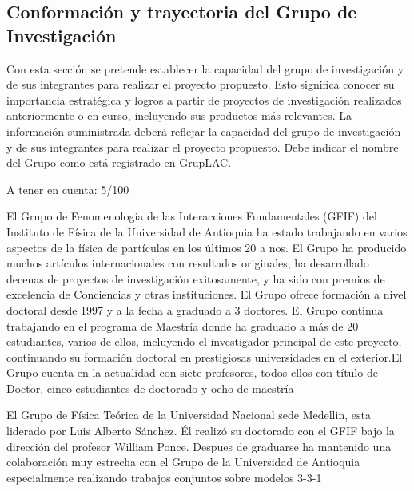 \begin{ideas}
\subsection{Conformación y trayectoria del Grupo de Investigación}
\begin{instrucciones}
  Con esta sección se pretende establecer la capacidad del grupo de
  investigación y de sus integrantes para realizar el proyecto
  propuesto. Esto significa conocer su importancia estratégica y
  logros a partir de proyectos de investigación realizados
  anteriormente o en curso, incluyendo sus productos más relevantes.
  La información suministrada deberá reflejar la capacidad del grupo
  de investigación y de sus integrantes para realizar el proyecto
  propuesto. Debe indicar el nombre del Grupo como está registrado en
  GrupLAC.
\end{instrucciones}
\begin{evaluacion}
  A tener en cuenta: 5/100
\end{evaluacion}
El Grupo de Fenomenología de las Interacciones Fundamentales (GFIF)
del Instituto de Física de la Universidad de Antioquia ha estado
trabajando en varios aspectos de la física de partículas en los
últimos 20 a nos. El Grupo ha producido muchos artículos
internacionales con resultados originales, ha desarrollado decenas de
proyectos de investigación exitosamente, y ha sido con premios de
excelencia de Conciencias y otras instituciones. El Grupo ofrece
formación a nivel doctoral desde 1997 y a la fecha a graduado a 3
doctores. El Grupo continua trabajando en el programa de Maestría
donde ha graduado a más de 20 estudiantes, varios de ellos, incluyendo
el investigador principal de este proyecto, continuando su formación
doctoral en prestigiosas universidades en el exterior.El Grupo cuenta
en la actualidad con siete profesores, todos ellos con título de
Doctor, cinco estudiantes de doctorado y ocho de maestría

El Grupo de Física Teórica de la Universidad Nacional sede Medellin,
esta liderado por Luis Alberto Sánchez. \'El realizó su doctorado con el
GFIF bajo la dirección del profesor William Ponce. Despues de
graduarse ha mantenido una colaboración muy estrecha con el Grupo de
la Universidad de Antioquia especialmente realizando trabajos
conjuntos sobre modelos 3-3-1
\end{ideas}
	

	